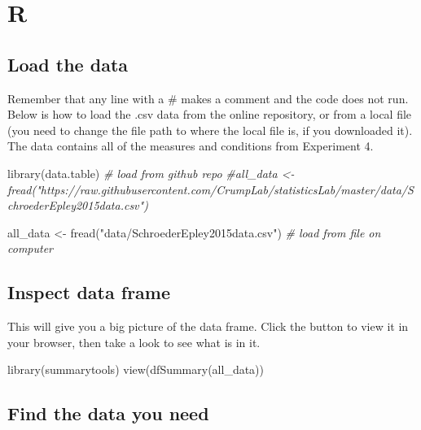 \documentclass[
]{book}
\newenvironment{Shaded}{\begin{snugshade}}{\end{snugshade}}
\newcommand{\CommentTok}[1]{\textcolor[rgb]{0.56,0.35,0.01}{\textit{#1}}}
\newcommand{\FunctionTok}[1]{\textcolor[rgb]{0.00,0.00,0.00}{#1}}
\newcommand{\NormalTok}[1]{#1}
\newcommand{\OtherTok}[1]{\textcolor[rgb]{0.56,0.35,0.01}{#1}}
\newcommand{\StringTok}[1]{\textcolor[rgb]{0.31,0.60,0.02}{#1}}
\begin{document}
\hypertarget{r-7}{%
\section{R}\label{r-7}}

\hypertarget{load-the-data-1}{%
\subsection{Load the data}\label{load-the-data-1}}

Remember that any line with a \# makes a comment and the code does not run. Below is how to load the .csv data from the online repository, or from a local file (you need to change the file path to where the local file is, if you downloaded it). The data contains all of the measures and conditions from Experiment 4.

\begin{Shaded}
\begin{Highlighting}[]
\FunctionTok{library}\NormalTok{(data.table)}
\CommentTok{\# load from github repo}
\CommentTok{\#all\_data \textless{}{-} fread("https://raw.githubusercontent.com/CrumpLab/statisticsLab/master/data/SchroederEpley2015data.csv")}

\NormalTok{all\_data }\OtherTok{\textless{}{-}} \FunctionTok{fread}\NormalTok{(}\StringTok{"data/SchroederEpley2015data.csv"}\NormalTok{) }\CommentTok{\# load from file on computer}
\end{Highlighting}
\end{Shaded}

\hypertarget{inspect-data-frame}{%
\subsection{Inspect data frame}\label{inspect-data-frame}}

This will give you a big picture of the data frame. Click the button to view it in your browser, then take a look to see what is in it.

\begin{Shaded}
\begin{Highlighting}[]
\FunctionTok{library}\NormalTok{(summarytools)}
\FunctionTok{view}\NormalTok{(}\FunctionTok{dfSummary}\NormalTok{(all\_data))}
\end{Highlighting}
\end{Shaded}

\hypertarget{find-the-data-you-need}{%
\subsection{Find the data you need}\label{find-the-data-you-need}}
\end{document}
